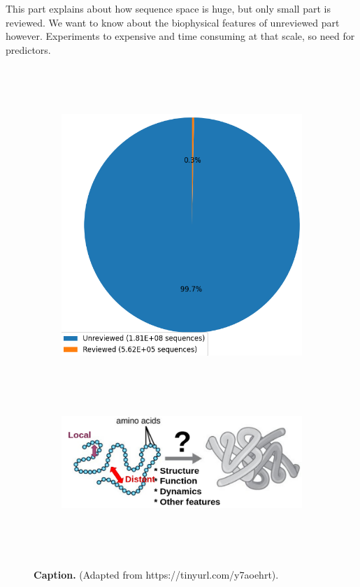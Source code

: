 This part explains about how sequence space is huge,
but only small part is reviewed.
We want to know about the biophysical features of unreviewed part however.
Experiments to expensive and time consuming at that scale,
so need for predictors.

~\begin{figure}[h!]
	~\begin{subfigure}[b]{0.28\linewidth}
		\includegraphics[width=\linewidth]{./literature_review/feature_prediction/img/sequence_space.png}
		\caption{}
	~\end{subfigure}
	~\begin{subfigure}[b]{0.70\linewidth}
		\includegraphics[width=\linewidth]{./literature_review/feature_prediction/img/feature_prediction.png}
		\caption{}
	~\end{subfigure}
	\caption{
		\textbf{Caption.}
	(Adapted from https://tinyurl.com/y7aoehrt).
	}
~\end{figure}
